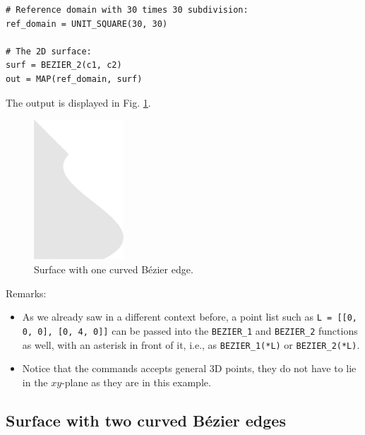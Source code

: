 \begin{bbox}
\begin{verbatim}
# Reference domain with 30 times 30 subdivision:
ref_domain = UNIT_SQUARE(30, 30)

# The 2D surface:
surf = BEZIER_2(c1, c2)
out = MAP(ref_domain, surf)
\end{verbatim}
\end{bbox}
\vspace{6mm}

\noindent
The output is displayed in Fig. \ref{fig:curves-1}.\\

\begin{figure}[!ht]
\begin{center}
\includegraphics[width=0.3\textwidth]{img/curves-1.png}
\end{center}
\vspace{-4mm}
\caption{Surface with one curved B\'ezier edge.}
\label{fig:curves-1}
\end{figure}

\noindent
Remarks:
\begin{itemize}
\item As we already saw in a different context before, a point list
such as {\tt L = [[0, 0, 0], [0, 4, 0]]} can be passed into 
the {\tt BEZIER\_1} and {\tt BEZIER\_2} functions as well, with 
an asterisk in front of it, i.e., as {\tt BEZIER\_1(*L)} or {\tt BEZIER\_2(*L)}.
\item Notice that the commands accepts general 3D points, they do not have 
to lie in the $xy$-plane as they are in this example.
\end{itemize}

\subsection{Surface with two curved B\'ezier edges}


